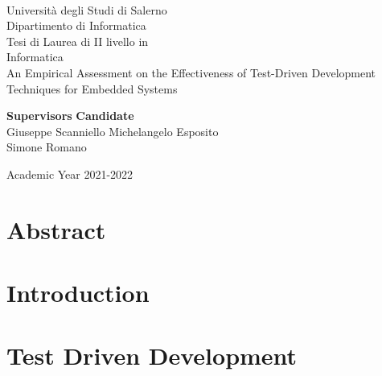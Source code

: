 \documentclass[11pt, oneside]{book}
\begin{document}
    \begin{titlepage}
        \begin{center}
            \\[0.2truecm]
            {\Large Universit\`a degli Studi di Salerno}\\[0.2truecm]
            {\large Dipartimento di Informatica}\\
            \hrulefill
            \vfill
            {\large Tesi di Laurea di II livello in }\\[0.2truecm]
            {\Large Informatica}\\
            \vfill\vfill
            {\Huge An Empirical Assessment on the Effectiveness of Test-Driven Development Techniques for Embedded Systems}
            \vfill\vfill
            
            
            {\bf Supervisors} \hfill {\bf Candidate}\ \ \\
            Giuseppe Scanniello \hfill Michelangelo Esposito\\
            Simone Romano \hfill \ \ \\
            
            \vfill
            \hrulefill 
            
            Academic Year 2021-2022
        \end{center}
    \end{titlepage}


    \chapter*{Abstract}
    
    
    \tableofcontents
    \pagestyle{plain}

    
    

    \chapter{Introduction}
    \setcounter{page}{1} 	%
    

    \chapter{Test Driven Development}
    
\end{document}
